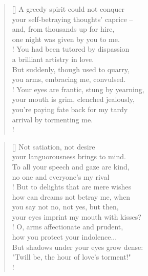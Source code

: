 \documentclass[]{article}
\newcommand{\poemauthorcenter}[1]{\nopagebreak{\centering\footnotesize\textsc{#1}\par}}
\begin{document}
\vspace*{0.04\textheight}
\settowidth{\versewidth}{your self-betraying thoughts' caprice -- }
\begin{verse}[\versewidth]
A greedy spirit could not conquer \\
your self-betraying thoughts' caprice -- \\
and, from thousands up for hire,\\
one night was given by you to me.\\!
You had been tutored by dispassion\\
a brilliant artistry in love.\\
But suddenly, though used to quarry,\\
you arms, embracing me, convulsed.\\!
Your eyes are frantic, stung by yearning,\\
your mouth is grim, clenched jealously,\\
you're paying fate back for my tardy\\
arrival by tormenting me.\\!
\end{verse}
\poemauthorcenter{\textit{1916}}
\bigskip \bigskip \bigskip


\settowidth{\versewidth}{your self-betraying thoughts' caprice --  }
\begin{verse}[\versewidth]
Not satiation, not desire\\
your languorousness brings to mind.\\
To all your speech and gaze are kind,\\
no one and everyone's my rival\\!
But to delights that are mere wishes\\
how can dreams not betray me, when \\
you say not no, not yes, but then,\\
your eyes imprint my mouth with kisses?\\!
O, arms affectionate and prudent,\\
how you protect your indolence...\\
But shadows under your eyes grow dense:\\
"Twill be, the hour of love's torment!"\\!
\end{verse}
\poemauthorcenter{\textit{January 1915}}
\newpage 
\end{document}

